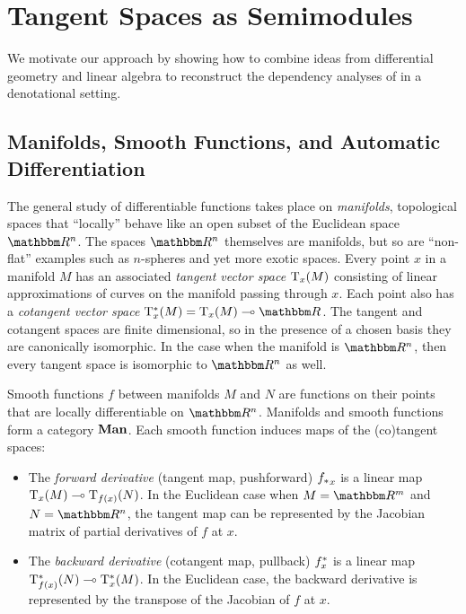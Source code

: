 \section{Tangent Spaces as Semimodules}
\label{sec:approx-as-tangents}

We motivate our approach by showing how to combine ideas from differential geometry and linear algebra to
reconstruct the dependency analyses of  in a denotational setting.

\subsection{Manifolds, Smooth Functions, and Automatic Differentiation}
\label{sec:approx-as-tangents:autodiff}

The general study of differentiable functions takes place on \emph{manifolds}, topological spaces that
``locally'' behave like an open subset of the Euclidean space $\RR^n$. The spaces $\RR^n$ themselves are
manifolds, but so are ``non-flat'' examples such as $n$-spheres and yet more exotic spaces. Every point $x$ in
a manifold $M$ has an associated \emph{tangent vector space} $\mathrm{T}_x(M)$ consisting of linear
approximations of curves on the manifold passing through $x$. Each point also has a \emph{cotangent vector
space} $\cotangents_x(M) = \tangents_x(M) \linearto \RR$. The tangent and cotangent spaces are finite
dimensional, so in the presence of a chosen basis they are canonically isomorphic. In the case when the
manifold is $\RR^n$, then every tangent space is isomorphic to $\RR^n$ as well.

Smooth functions $f$ between manifolds $M$ and $N$ are functions on their points that are locally
differentiable on $\RR^n$. Manifolds and smooth functions form a category $\mathbf{Man}$. Each smooth function induces
maps of the (co)tangent spaces:
\begin{itemize}[leftmargin=\enummargin]
\item The \emph{forward derivative} (tangent map, pushforward) ${f_{*}}_x$ is a linear map $\mathrm{T}_x(M)
\multimap \mathrm{T}_{f(x)}(N)$. In the Euclidean case when $M = \RR^m$ and $N = \RR^n$, the tangent map can be
represented by the Jacobian matrix of partial derivatives of $f$ at $x$.
\item The \emph{backward derivative} (cotangent map, pullback) $f^{*}_x$ is a linear map
$\mathrm{T}^*_{f(x)}(N) \multimap \mathrm{T}^*_x(M)$. In the Euclidean case, the backward derivative is
represented by the transpose of the Jacobian of $f$ at $x$.
\end{itemize}

